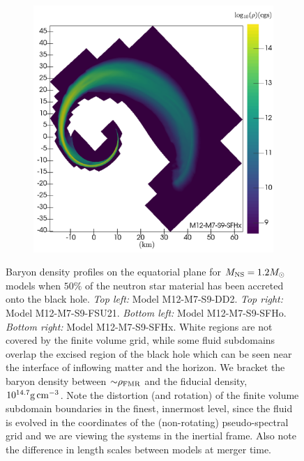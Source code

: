 \begin{figure}
\begin{subfigure}[b]{0.475\textwidth}
		\label{fig:rho_M12_SFHo}
	\end{subfigure}
	\begin{subfigure}[b]{0.475\textwidth}
		\centering
		\includegraphics[width=\linewidth]{images/rho_SFHx_M12-merger-inertial}
		\label{fig:rho_M12_SFHx}
	\end{subfigure}
	\caption[Density profiles on equatorial plane for $1.2 M_{\odot}$ models]{
		Baryon density profiles on the equatorial plane for $M_{\rm NS} = 1.2 M_{\odot}$ models when $50\%$ of the neutron star material has been accreted onto the black hole.
		\textit{Top left:} Model M12-M7-S9-DD2.
		\textit{Top right:} Model M12-M7-S9-FSU21.
		\textit{Bottom left:} Model M12-M7-S9-SFHo.
		\textit{Bottom right:} Model M12-M7-S9-SFHx.
		White regions are not covered by the finite volume grid, while some fluid subdomains overlap the excised region of the black hole which can be seen near the interface of inflowing matter and the horizon.  We bracket the baryon density between $\mathord{\sim} \rho_{\rm FMR}$ and the fiducial density, $10^{14.7} {\rm g\,cm^{-3}}$. Note the distortion (and rotation) of the finite volume subdomain boundaries in the finest, innermost level, since the fluid is evolved in the coordinates of the (non-rotating) pseudo-spectral grid and we are viewing the systems in the inertial frame.  Also note the difference in length scales between models at merger time.
	}
	\label{fig:rho_M12}
\end{figure}


